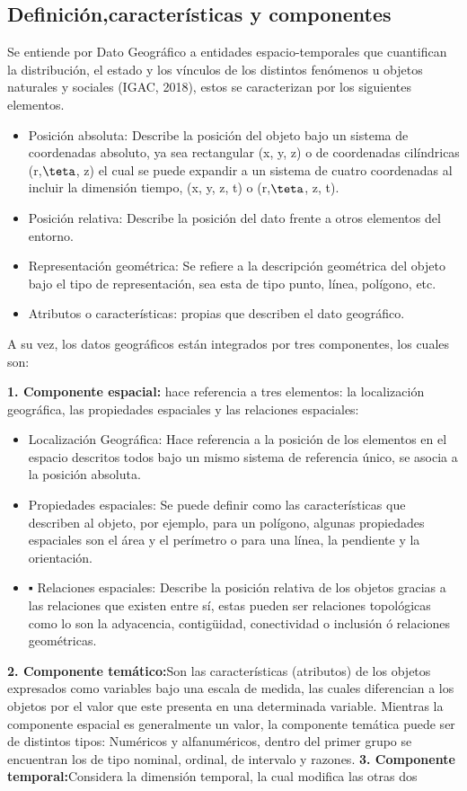 \documentclass[12pt,hidelinks]{article}
\begin{document}
\subsection{Definición,características y componentes }
Se entiende por Dato Geográfico a entidades espacio-temporales que cuantifican la
distribución, el estado y los vínculos de los distintos fenómenos u objetos naturales y sociales (IGAC,
2018), estos se caracterizan por los siguientes elementos.
\begin{itemize}
\item Posición absoluta: Describe la posición del objeto bajo un sistema de coordenadas absoluto,
ya sea rectangular (x, y, z) o de coordenadas cilíndricas (r,$\teta$, z) el cual se puede expandir a
un sistema de cuatro coordenadas al incluir la dimensión tiempo, (x, y, z, t) o (r,$\teta$, z, t).
\item Posición relativa: Describe la posición del dato frente a otros elementos del entorno.
\item Representación geométrica: Se refiere a la descripción geométrica del objeto bajo el tipo de
representación, sea esta de tipo punto, línea, polígono, etc.
\item Atributos o características: propias que describen el dato geográfico.

\end{itemize}
A su vez, los datos geográficos están integrados por tres componentes, los cuales son:

\textbf{1. Componente espacial:} hace referencia a tres elementos: la localización geográfica, las
propiedades espaciales y las relaciones espaciales:
\begin{itemize}
    \item Localización Geográfica: Hace referencia a la posición de los elementos en el espacio
descritos todos bajo un mismo sistema de referencia único, se asocia a la posición
absoluta.
\item Propiedades espaciales: Se puede definir como las características que describen al
objeto, por ejemplo, para un polígono, algunas propiedades espaciales son el área
y el perímetro o para una línea, la pendiente y la orientación.
\item ▪ Relaciones espaciales: Describe la posición relativa de los objetos gracias a las
relaciones que existen entre sí, estas pueden ser relaciones topológicas como lo son
la adyacencia, contigüidad, conectividad o inclusión ó relaciones geométricas.
\end{itemize}
\textbf{2. Componente temático:}Son las características (atributos) de los objetos expresados como
variables bajo una escala de medida, las cuales diferencian a los objetos por el valor que
este presenta en una determinada variable. Mientras la componente espacial es
generalmente un valor, la componente temática puede ser de distintos tipos: Numéricos y alfanuméricos, dentro del primer grupo se encuentran los de tipo nominal, ordinal, de
intervalo y razones.
\textbf{3. Componente temporal:}Considera la dimensión temporal, la cual modifica las otras dos
\end{document}
